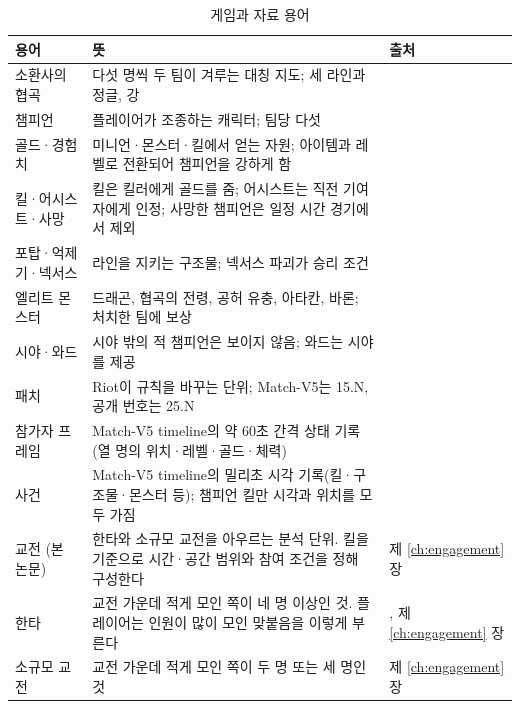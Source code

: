 \begin{table}[!t]
  \centering
  \caption{게임과 자료 용어}
  \label{tab:terms}
  \footnotesize
  \begin{tabularx}{\linewidth}{@{}>{\raggedright\arraybackslash}p{3.0cm}X>{\raggedright\arraybackslash}p{3.4cm}@{}}
    \toprule
    용어 & 뜻 & 출처 \\
    \midrule
    소환사의 협곡 & 다섯 명씩 두 팀이 겨루는 대칭 지도; 세 라인과 정글, 강 & \cite{lolwiki2025summonersrift,riotapi2024matchv5} \\
    챔피언 & 플레이어가 조종하는 캐릭터; 팀당 다섯 & \cite{lolwiki2026champion} \\
    골드·경험치 & 미니언·몬스터·킬에서 얻는 자원; 아이템과 레벨로 전환되어 챔피언을 강하게 함 & \cite{lolwiki2026gold,lolwiki2026experience} \\
    킬·어시스트·사망 & 킬은 킬러에게 골드를 줌; 어시스트는 직전 기여자에게 인정; 사망한 챔피언은 일정 시간 경기에서 제외 & \cite{lolwiki2026kill,lolwiki2026assist,lolwiki2026death} \\
    포탑·억제기·넥서스 & 라인을 지키는 구조물; 넥서스 파괴가 승리 조건 & \cite{lolwiki2026turret,lolwiki2026inhibitor,lolwiki2026nexus} \\
    엘리트 몬스터 & 드래곤, 협곡의 전령, 공허 유충, 아타칸, 바론; 처치한 팀에 보상 & \cite{lolwiki2026dragonpit,lolwiki2026riftherald,lolwiki2026voidgrub,lolwiki2026atakhan,lolwiki2026baron} \\
    시야·와드 & 시야 밖의 적 챔피언은 보이지 않음; 와드는 시야를 제공 & \cite{lolwiki2026sight,lolwiki2025ward} \\
    패치 & Riot이 규칙을 바꾸는 단위; Match-V5는 15.N, 공개 번호는 25.N & \cite{riot2025patch25s11,lolwiki2026v2514} \\
    참가자 프레임 & Match-V5 timeline의 약 60초 간격 상태 기록(열 명의 위치·레벨·골드·체력) & \cite{riotapi2024timeline} \\
    사건 & Match-V5 timeline의 밀리초 시각 기록(킬·구조물·몬스터 등); 챔피언 킬만 시각과 위치를 모두 가짐 & \cite{riotapi2024timeline} \\
    교전 (본 논문) & 한타와 소규모 교전을 아우르는 분석 단위. 킬을 기준으로 시간·공간 범위와 참여 조건을 정해 구성한다 & 제 \ref{ch:engagement} 장 \\
    한타 & 교전 가운데 적게 모인 쪽이 네 명 이상인 것. 플레이어는 인원이 많이 모인 맞붙음을 이렇게 부른다 & \cite{lolwiki2026terminology}, 제 \ref{ch:engagement} 장 \\
    소규모 교전 & 교전 가운데 적게 모인 쪽이 두 명 또는 세 명인 것 & 제 \ref{ch:engagement} 장 \\
    \bottomrule
  \end{tabularx}
\end{table}
